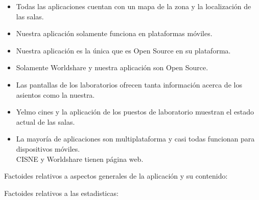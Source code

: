 \documentclass[12pt]{article}
\begin{document}
\begin{itemize}
\begin{itemize}
\item Todas las aplicaciones cuentan con un mapa de la zona y la localización de las salas.\\

\item Nuestra aplicación solamente funciona en plataformas móviles.\\

\item Nuestra aplicación es la única que es Open Source en su plataforma.\\

\item Solamente Worldshare y nuestra aplicación son Open Source.\\

\item Las pantallas de los laboratorios ofrecen tanta información acerca de los asientos como la nuestra.\\

\item Yelmo cines y la aplicación de los puestos de laboratorio muestran el estado actual de las salas.\\
\item La mayoría de aplicaciones son multiplataforma y casi todas funcionan para dispositivos móviles.\\
CISNE y Worldshare tienen página web.\\


\end{itemize}
\end{itemize}


Factoides relativos a aspectos generales de la aplicación y su contenido:




Factoides relativos a las estadisticas:
\end{document}
